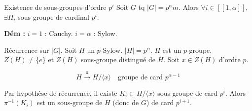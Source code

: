 \vspace{0.5cm}

\begin{corollairent}{Existence de sous-groupes d'ordre $p^i$}
Soit $G$ tq $|G| = p^\alpha m$.
Alors $\forall i \in [\![ 1, \alpha ]\!]$, $\exists H_i$ sous-groupe de cardinal $p^i$.
\end{corollairent}

\textbf{Dém :}
$i=1$ : Cauchy.
$i=\alpha$ : Sylow.

Récurrence sur $|G|$. Soit $H$ un $p$-Sylow. $|H| = p^\alpha$. $H$ est un $p$-groupe.
$Z(H) \neq \{e\}$ et $Z(H)$ sous-groupe distingué de $H$.
Soit $x \in Z(H)$ d'ordre $p$.

\[ H \xrightarrow{\pi} H/\langle x \rangle \quad \text{groupe de card } p^{\alpha-1} \]

Par hypothèse de récurrence, il existe $K_i \subset H/\langle x \rangle$ sous-groupe de card $p^i$.
Alors $\pi^{-1}(K_i)$ est un sous-groupe de $H$ (donc de $G$) de card $p^{i+1}$.
